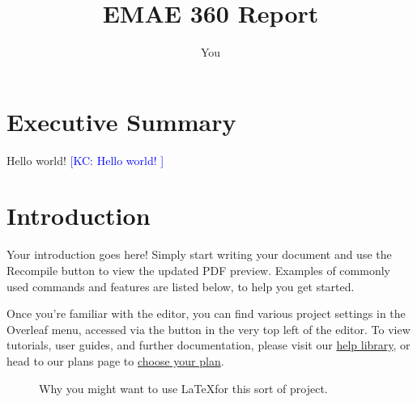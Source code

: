 \documentclass{article}
\title{EMAE 360 Report}
\author{You}
\makeatletter
\newcommand{\KCnote}[1]{{\textcolor{blue}{[KC: #1 \index{\thepage @ #1}]}}} %
\makeatother
\begin{document}
\maketitle
\newpage

\tableofcontents
\newpage

\section*{Executive Summary}
Hello world!
\KCnote{Hello world!}
\newpage

\section{Introduction}

Your introduction goes here! Simply start writing your document and use the Recompile button to view the updated PDF preview. Examples of commonly used commands and features are listed below, to help you get started.

Once you're familiar with the editor, you can find various project settings in the Overleaf menu, accessed via the button in the very top left of the editor. To view tutorials, user guides, and further documentation, please visit our \href{https://www.overleaf.com/learn}{help library}, or head to our plans page to \href{https://www.overleaf.com/user/subscription/plans}{choose your plan}.

\begin{figure}
    \centering
{}


    \caption{Why you might want to use \LaTeX for this sort of project.}
    \label{fig:whylatex}
\end{figure}
\end{document}
